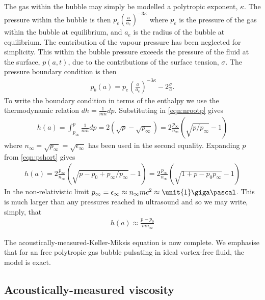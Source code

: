 \documentclass[10pt, fleqn,draft,showtrims,oldfontcommands]{article} %
\newcommand{\eqnref}[1]{\ref{eqn:#1}}
\newcommand{\lr}[1]{\left( #1 \right)}
\begin{document}
The gas within the bubble may simply be modelled a polytropic exponent, $\kappa$. 
The pressure within the bubble is then $p_e \lr{\frac{a}{a_e}}^{-3\kappa}$ where $p_e$ is the pressure of the gas within the bubble at equilibrium,
and $a_e$ is the radius of the bubble at equilibrium\cite{Hoff2001}.
The contribution of the vapour pressure has been neglected for simplicity.
This within the bubble pressure exceeds the pressure of the fluid at the surface, $p(a,t)$, due to the contributions of the surface tension, $\sigma$.
The pressure boundary condition is then
\begin{align}
  p_b(a) = p_e \lr{\frac{a}{a_e}}^{-3\kappa} - 2\frac{\sigma}{a}. 
\end{align}
To write the boundary condition in terms of the enthalpy we use the  thermodynamic relation $d h = \frac{1}{m n} dp$.
Substituting in \eqnref{nrootp} gives
\begin{align}
  h(a) =  \int_{p_\infty}^{p}  \frac{1}{m n}dp = 2\lr{\sqrt{p}-\sqrt{ p_\infty}} = 2 \frac{p_\infty}{n_\infty} \lr{\sqrt{p/p_\infty} - 1} 
\end{align}
where  $n_\infty = \sqrt{p_\infty} = \sqrt{\epsilon_\infty} $ has been used in the second equality.
Expanding $p$ from \eqnref{pshort} gives
\begin{align}
  h(a) = 2 \frac{p_\infty}{n_\infty} \lr{\sqrt{{p-p_0+p_\infty}/p_\infty} - 1} =  2 \frac{p_\infty}{n_\infty} \lr{\sqrt{1 + {p - p_0}{p_\infty}} - 1}
\end{align}
In the non-relativistic limit $p_\infty = \epsilon_\infty \approx n_\infty m c^2 \approx \unit{1}\giga\pascal$\cite{Hoff2001}.
This is much larger than any pressures reached in ultrasound and so we may write, simply, that
\begin{align}
  h(a) \approx \frac{p - p_0}{mn_\infty}
\end{align}



The acoustically-measured-Keller-Miksis equation is now complete. 
We emphasise that for an free polytropic gas bubble pulsating in ideal vortex-free fluid, the model is exact.


\subsection{Acoustically-measured viscosity}\label{sec:viscosity}
\end{document}
